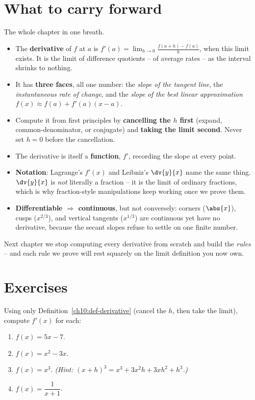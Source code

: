 \section{What to carry forward}
\label{ch10:summary}

\begin{recoverybox}
The whole chapter in one breath.
\begin{itemize}
  \item The \textbf{derivative} of $f$ at $a$ is
  $f'(a) = \displaystyle\lim_{h\to 0}\frac{f(a+h)-f(a)}{h}$, when this limit
  exists. It is the limit of difference quotients -- of average rates -- as the
  interval shrinks to nothing.
  \item It has \textbf{three faces}, all one number: the \emph{slope of the
  tangent line}, the \emph{instantaneous rate of change}, and the \emph{slope of
  the best linear approximation} $f(x)\approx f(a)+f'(a)(x-a)$.
  \item Compute it from first principles by \textbf{cancelling the $h$ first}
  (expand, common-denominator, or conjugate) and \textbf{taking the limit second}.
  Never set $h=0$ before the cancellation.
  \item The derivative is itself a \textbf{function}, $f'$, recording the slope at
  every point.
  \item \textbf{Notation}: Lagrange's $f'(x)$ and Leibniz's $\dv{y}{x}$ name the
  same thing. $\dv{y}{x}$ is \emph{not} literally a fraction -- it is the limit of
  ordinary fractions, which is why fraction-style manipulations keep working once we
  prove them.
  \item \textbf{Differentiable $\Rightarrow$ continuous}, but not conversely:
  corners ($\abs{x}$), cusps ($x^{2/3}$), and vertical tangents ($x^{1/3}$) are
  continuous yet have no derivative, because the secant slopes refuse to settle on
  one finite number.
\end{itemize}
Next chapter we stop computing every derivative from scratch and build the
\emph{rules} -- and each rule we prove will rest squarely on the limit definition
you now own.
\end{recoverybox}

\section{Exercises}
\label{ch10:exercises}

\begin{exercise}
\label{ch10:ex-warmups}
Using only Definition~\ref{ch10:def-derivative} (cancel the $h$, then take the
limit), compute $f'(x)$ for each:
\begin{enumerate}[label=(\alph*)]
  \item $f(x) = 5x - 7$.
  \item $f(x) = x^2 - 3x$.
  \item $f(x) = x^3$. \emph{(Hint: $(x+h)^3 = x^3 + 3x^2 h + 3x h^2 + h^3$.)}
  \item $f(x) = \dfrac{1}{x + 1}$.
\end{enumerate}
\end{exercise}

